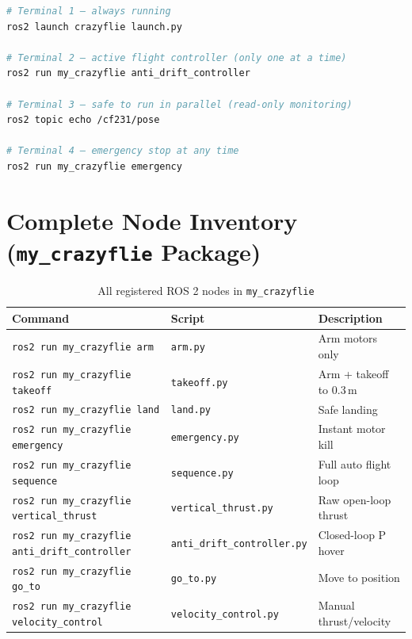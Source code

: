 \documentclass[11pt,a4paper]{article}
\begin{document}
\begin{lstlisting}[language=bash]
# Terminal 1 — always running
ros2 launch crazyflie launch.py

# Terminal 2 — active flight controller (only one at a time)
ros2 run my_crazyflie anti_drift_controller

# Terminal 3 — safe to run in parallel (read-only monitoring)
ros2 topic echo /cf231/pose

# Terminal 4 — emergency stop at any time
ros2 run my_crazyflie emergency
\end{lstlisting}

\section{Complete Node Inventory (\texttt{my\_crazyflie} Package)}

\begin{table}[h!]
\centering
\caption{All registered ROS 2 nodes in \texttt{my\_crazyflie}}
\vspace{0.3em}
\begin{tabular}{@{}lll@{}}
\toprule
\textbf{Command}                                 & \textbf{Script}                   & \textbf{Description} \\ \midrule
\texttt{ros2 run my\_crazyflie arm}              & \texttt{arm.py}                   & Arm motors only \\
\texttt{ros2 run my\_crazyflie takeoff}          & \texttt{takeoff.py}               & Arm + takeoff to 0.3\,m \\
\texttt{ros2 run my\_crazyflie land}             & \texttt{land.py}                  & Safe landing \\
\texttt{ros2 run my\_crazyflie emergency}        & \texttt{emergency.py}             & Instant motor kill \\
\texttt{ros2 run my\_crazyflie sequence}         & \texttt{sequence.py}              & Full auto flight loop \\
\texttt{ros2 run my\_crazyflie vertical\_thrust} & \texttt{vertical\_thrust.py}      & Raw open-loop thrust \\
\texttt{ros2 run my\_crazyflie anti\_drift\_controller} & \texttt{anti\_drift\_controller.py} & Closed-loop P hover \\
\texttt{ros2 run my\_crazyflie go\_to}           & \texttt{go\_to.py}                & Move to position \\
\texttt{ros2 run my\_crazyflie velocity\_control}& \texttt{velocity\_control.py}     & Manual thrust/velocity \\
\bottomrule
\end{tabular}
\end{table}
\end{document}
